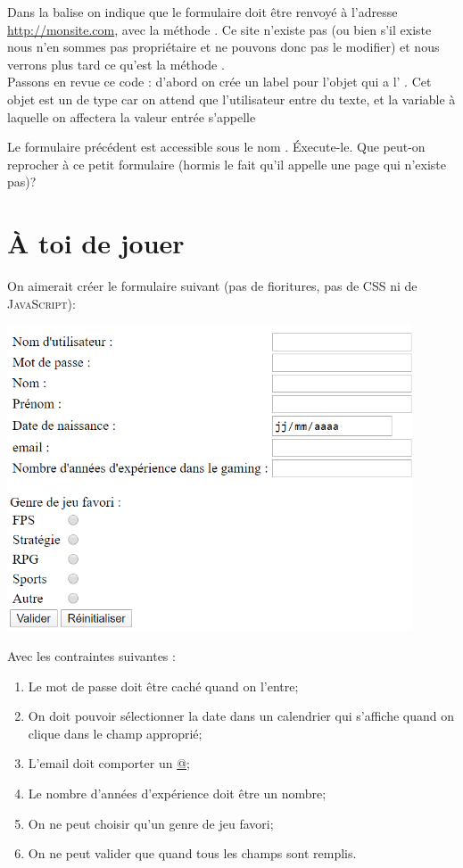 \documentclass[a4paper,11pt]{book}
\begin{document}
Dans la balise  on indique que le formulaire doit être renvoyé à l'adresse \url{http://monsite.com}, avec la méthode . Ce 
site n'existe pas (ou bien s'il existe nous n'en sommes pas propriétaire et ne pouvons donc pas le modifier) et nous verrons plus tard ce qu'est la 
méthode .\\
Passons en revue ce code : d'abord on crée un label pour l'objet qui a l' . Cet objet est un  de type 
 car on attend que l'utilisateur entre du texte, et la variable à laquelle on affectera la valeur entrée s'appelle 


\begin{exercice}[]
Le formulaire précédent est accessible sous le nom . \'Execute-le. Que peut-on reprocher à ce petit formulaire (hormis 
le fait qu'il appelle une page qui n'existe pas)?
\end{exercice}

\section*{À toi de jouer}

On aimerait créer le formulaire suivant (pas de fioritures, pas de \textsc{CSS} ni de \textsc{JavaScript}):
\begin{center}
\includegraphics[width=12cm]{img/formulaire.png}
\end{center}

Avec les contraintes suivantes :
\begin{enumerate}[--]
	\item 	Le mot de passe doit être caché quand on l'entre;
	\item 	On doit pouvoir sélectionner la date dans un calendrier qui s'affiche quand on clique dans le champ approprié;
	\item 	L'email doit comporter un \url{@};
	\item 	Le nombre d'années d'expérience doit être un nombre;
	\item 	On ne peut choisir qu'un genre de jeu favori;
	\item 	On ne peut valider que quand tous les champs sont remplis.
\end{enumerate}
\end{document}
